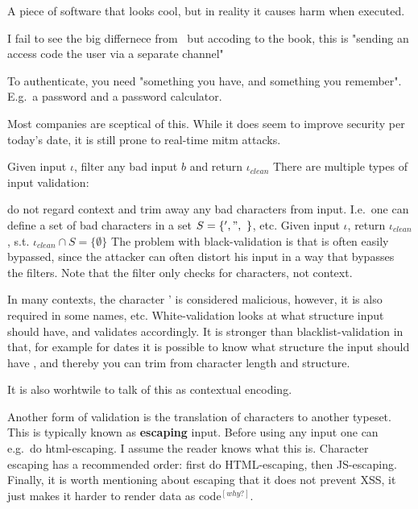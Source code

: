 \begin{definition}[Trojan]
    A piece of software that looks cool, but in reality it causes harm
    when executed.
\end{definition}

\begin{definition}
    I fail to see the big differnece from~
    but accoding to the book, this is "sending an access code the user
    via a separate channel"
\end{definition}

\begin{definition}\label{twofactor}
    To authenticate, you need "something you have, and something you remember".
    E.g.\ a password and a password calculator.

    Most companies are sceptical of this. While it does seem to improve
    security per today's date, it is still prone to real-time mitm attacks.
\end{definition}


\begin{definition}\label{validation}
    Given input $\iota$, filter any bad input $b$ and return $\iota_{clean}$
    There are multiple types of input validation:
    \begin{description}[labelindent=1cm]
        \item[Blacklist-validation] do not regard context and trim away any bad 
            characters from input. 
            I.e.\ one can define a set of bad characters in a set
            $S = \{ ' , " , \ \}$, etc. Given input $\iota$, return 
            $\iota_{clean}$, s.t. $\iota_{clean} \cap S = \{\emptyset\}$
            The problem with black-validation is that is often easily bypassed,
            since the attacker can often distort his input in a way that bypasses
            the filters. Note that the filter only checks for characters, not context.
        \item[Whitelist-validation]
            In many contexts, the character ' is considered malicious, however,
            it is also required in some names, etc. White-validation looks
            at what structure input should have, and validates accordingly.
            It is stronger than blacklist-validation in that, for example 
            for dates it is possible to know what structure the input should have
            , and thereby you can trim from character length and structure.

            It is also worhtwile to talk of this as contextual encoding.
    \end{description}
    
    Another form of validation is the translation of characters to another typeset.
    This is typically known as \textbf{escaping} input. Before using any
    input one can e.g.\ do html-escaping. I assume the reader knows what this is.
    Character escaping has a recommended order: first do HTML-escaping, then
    JS-escaping. Finally, it is worth mentioning about escaping that it 
    does not prevent XSS, it just makes it harder to render data as code$^{[why?]}$.
\end{definition}

